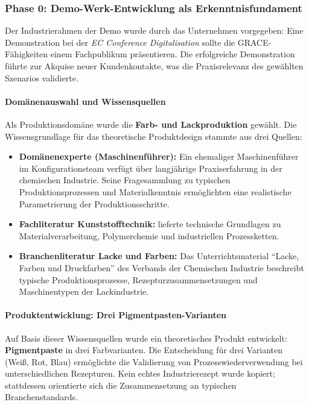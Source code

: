 \subsubsection{Phase 0: Demo-Werk-Entwicklung als Erkenntnisfundament}
\label{subsubsec:Phase0}

Der Industrierahmen der Demo wurde durch das Unternehmen vorgegeben: Eine Demonstration bei der \textit{EC Conference Digitalisation} sollte die GRACE-Fähigkeiten einem Fachpublikum präsentieren. Die erfolgreiche Demonstration führte zur Akquise neuer Kundenkontakte, was die Praxisrelevanz des gewählten Szenarios validierte.

\paragraph{Domänenauswahl und Wissensquellen}

Als Produktionsdomäne wurde die \textbf{Farb- und Lackproduktion} gewählt. Die Wissensgrundlage für das theoretische Produktdesign stammte aus drei Quellen:

\begin{itemize}
    \item \textbf{Domänenexperte (Maschinenführer):} Ein ehemaliger Maschinenführer im Konfigurationsteam verfügt über langjährige Praxiserfahrung in der chemischen Industrie. Seine Fragesammlung zu typischen Produktionsprozessen und Materialkenntnis ermöglichten eine realistische Parametrierung der Produktionsschritte.

    \item \textbf{Fachliteratur Kunststofftechnik:} \cite{schwarz:kunststoffkunde1987} lieferte technische Grundlagen zu Materialverarbeitung, Polymerchemie und industriellen Prozessketten.

    \item \textbf{Branchenliteratur Lacke und Farben:} Das Unterrichtsmaterial ``Lacke, Farben und Druckfarben'' des Verbands der Chemischen Industrie \citep{vci:lacke_farben2018} beschreibt typische Produktionsprozesse, Rezepturzusammensetzungen und Maschinentypen der Lackindustrie.
\end{itemize}

\paragraph{Produktentwicklung: Drei Pigmentpasten-Varianten}

Auf Basis dieser Wissensquellen wurde ein theoretisches Produkt entwickelt: \textbf{Pigmentpaste} in drei Farbvarianten. Die Entscheidung für drei Varianten (Weiß, Rot, Blau) ermöglichte die Validierung von Prozesswiederverwendung bei unterschiedlichen Rezepturen. Kein echtes Industrierezept wurde kopiert; stattdessen orientierte sich die Zusammensetzung an typischen Branchenstandards.

